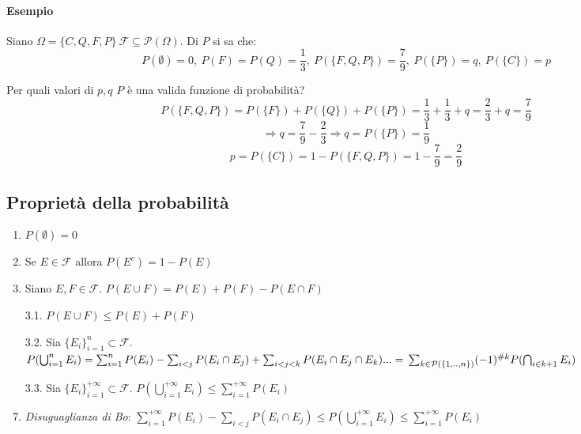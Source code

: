 \documentclass[12pt, a4paper]{report}
\theoremstyle{definition}
\DeclareRobustCommand{\F}{\mathcal{F}}%
\DeclareRobustCommand{\powerset}{\mathcal{P}(\Omega)}
\DeclareRobustCommand{\tribedef}{\F\subseteq \powerset}
\begin{document}
\paragraph*{Esempio}
Siano \(\Omega=\{C, Q, F, P\}\ \tribedef\). Di $P$ si sa che:
\[P(\emptyset)=0,\ P(F) = P(Q)=\frac{1}{3},\ P(\{F, Q, P\})=\frac{7}{9},\
P(\{P\})=q,\ P(\{C\})=p\]

\noindent
Per quali valori di $p, q$ $P$ è una valida funzione di probabilità?
\[P(\{F,Q,P\}) = P(\{F\}) + P(\{Q\}) + P(\{P\}) = \frac{1}{3} + \frac{1}{3} + q=
\frac{2}{3} + q = \frac{7}{9}\]
\[\Rightarrow q = \frac{7}{9}-\frac{2}{3} \Rightarrow q = P(\{P\}) = \frac{1}{9}\]
\[p = P(\{C\}) = 1 - P(\{F,Q,P\}) = 1 - \frac{7}{9} = \frac{2}{9}\]

\subsection{Proprietà della probabilità}
\begin{enumerate}
	\item \(P(\emptyset) = 0\)
	\item Se \(E\in\F\) allora \(P(E^c) = 1 - P(E)\)
	\item Siano \(E,F\in\F\). \(P(E\cup F) = P(E) + P(F) - P(E\cap F)\)
	\item[3.1.] \(P(E\cup F)\leq P(E) + P(F)\)
	\item[3.2.] Sia \(\{E_i\}_{i=1}^n\subset\F\).
	\\\(P(\bigcup_{i=1}^n E_i)=\sum_{i=1}^n P(E_i)-\sum_{i<j}P(E_i\cap E_j)+
	\sum_{i<j<k}P(E_i\cap E_j\cap E_k)...=
	\\\sum_{k\in\mathcal{P}(\{1,..,n\})}(-1)^{\#k}P(\bigcap_{i\in k+1} E_i)\)
	\item[3.3.] Sia \(\{E_i\}_{i=1}^{+\infty}\subset\F\).
	\(P(\bigcup_{i=1}^{+\infty}E_i)\leq\sum_{i=1}^{+\infty}P(E_i)\)
	\item \emph{Disuguaglianza di Bo}: \(\sum_{i=1}^{+\infty}P(E_i)-\sum_{i<j}
	P(E_i\cap E_j)\leq P(\bigcup_{i=1}^{+\infty}E_i)\leq\sum_{i=1}^{+\infty}P(E_i)\)
\end{enumerate}
\end{document}
